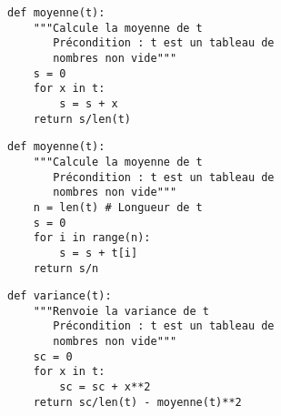 
\begin{lstlisting}
def moyenne(t):
    """Calcule la moyenne de t
       Précondition : t est un tableau de 
       nombres non vide"""
    s = 0 
    for x in t:
        s = s + x 
    return s/len(t)
\end{lstlisting}

\begin{lstlisting}
def moyenne(t):
    """Calcule la moyenne de t
       Précondition : t est un tableau de 
       nombres non vide"""
    n = len(t) # Longueur de t
    s = 0 
    for i in range(n):
        s = s + t[i]
    return s/n 
\end{lstlisting}


\begin{lstlisting}
def variance(t):
    """Renvoie la variance de t
       Précondition : t est un tableau de 
       nombres non vide"""
    sc = 0
    for x in t:
        sc = sc + x**2 
    return sc/len(t) - moyenne(t)**2
\end{lstlisting}


